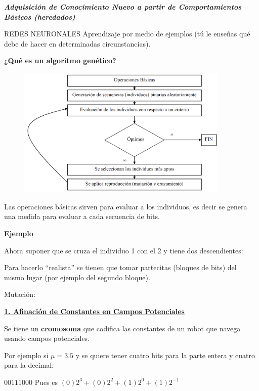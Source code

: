 \textbf{\textit{Adquisición de Conocimiento Nuevo a partir de Comportamientos Básicos (heredados)}}

REDES NEURONALES
Aprendizaje por medio de ejemplos (tú le enseñas qué debe de hacer en determinadas circunstancias).


\textbf{¿Qué es un algoritmo genético?}

\begin{figure}[h!]
	\centering
	\includegraphics[width=0.9\textwidth]{images/img82.png}
	\label{figura82}
\end{figure}

Las operaciones básicas sirven para evaluar a los individuos, es decir se genera una medida para evaluar a
cada secuencia de bits.

\textbf{Ejemplo}


Ahora suponer que se cruza el individuo 1 con el 2 y tiene dos descendientes:


Para hacerlo “realista” se tienen que tomar partecitas (bloques de bits) del mismo lugar (por ejemplo del
segundo bloque).

Mutación:


\textbf{\underline{1. Afinación de Constantes en Campos Potenciales}}

Se tiene un \textbf{cromosoma} que codifica las constantes de un robot que navega usando campos potenciales.


Por ejemplo si $\mu = 3.5$ y se quiere tener cuatro bits para la parte entera y cuatro para la decimal:

$0011 1000$
Pues es $(0)2^3 + (0)2^2 + (1)2^0 + (1)2^{-1}$

